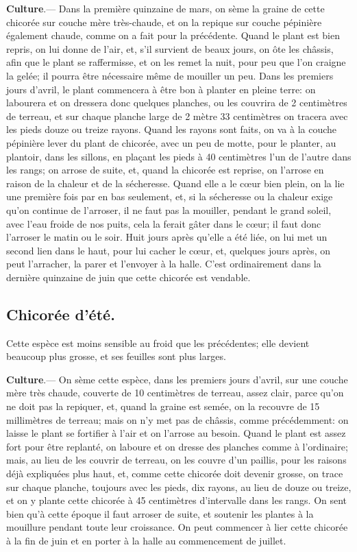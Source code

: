 \documentclass[10pt,a4paper]{book}
\begin{document}
\textbf{Culture}.--- Dans la première quinzaine de mars, on sème la graine de cette chicorée sur couche mère très-chaude, et on la repique sur couche pépinière également chaude, comme on a fait pour la précédente. Quand le plant est bien repris, on lui donne de l'air, et, s'il survient de beaux jours, on ôte les châssis, afin que le plant se raffermisse, et on les remet la nuit, pour peu que l'on craigne la gelée; il pourra être nécessaire même de mouiller un peu. Dans les premiers jours d'avril, le plant commencera à être bon à planter en pleine terre: on labourera et on dressera donc quelques planches, ou les couvrira de 2 centimètres de terreau, et sur chaque planche large de 2 mètre 33 centimètres on tracera avec les pieds douze ou treize rayons. Quand les rayons sont faits, on va à la couche pépinière lever du plant de chicorée, avec un peu de motte, pour le planter, au plantoir, dans les sillons, en plaçant les pieds à 40 centimètres l'un de l'autre dans les rangs; on arrose de suite, et, quand la chicorée est reprise, on l'arrose en raison de la chaleur et de la sécheresse. Quand elle a le cœur bien plein, on la lie une première fois par en bas seulement, et, si la sécheresse ou la chaleur exige qu'on continue de l'arroser, il ne faut pas la mouiller, pendant le grand soleil, avec l'eau froide de nos puits, cela la ferait gâter dans le cœur; il faut donc l'arroser le matin ou le soir. Huit jours après qu'elle a été liée, on lui met un second lien dans le haut, pour lui cacher le cœur, et, quelques jours après, on peut l'arracher, la parer et l'envoyer à la halle. C'est ordinairement dans la dernière quinzaine de juin que cette chicorée est vendable.

\subsection{Chicorée d'été.}

Cette espèce est moins sensible au froid que les précédentes; elle devient beaucoup plus grosse, et ses feuilles sont plus larges.

\textbf{Culture}.--- On sème cette espèce, dans les premiers jours d'avril, sur une couche mère très chaude, couverte de 10 centimètres de terreau, assez clair, parce qu'on ne doit pas la repiquer, et, quand la graine est semée, on la recouvre de 15 millimètres de terreau; mais on n'y met pas de châssis, comme précédemment: on laisse le plant se fortifier à l'air et on l'arrose au besoin. Quand le plant est assez fort pour être replanté, on laboure et on dresse des planches comme à l'ordinaire; mais, au lieu de les couvrir de terreau, on les couvre d'un paillis, pour les raisons déjà expliquées plus haut, et, comme cette chicorée doit devenir grosse, on trace sur chaque planche, toujours avec les pieds, dix rayons, au lieu de douze ou treize, et on y plante cette chicorée à 45 centimètres d'intervalle dans les rangs. On sent bien qu'à cette époque il faut arroser de suite, et soutenir les plantes à la mouillure pendant toute leur croissance. On peut commencer à lier cette chicorée à la fin de juin et en porter à la halle au commencement de juillet.
\end{document}
